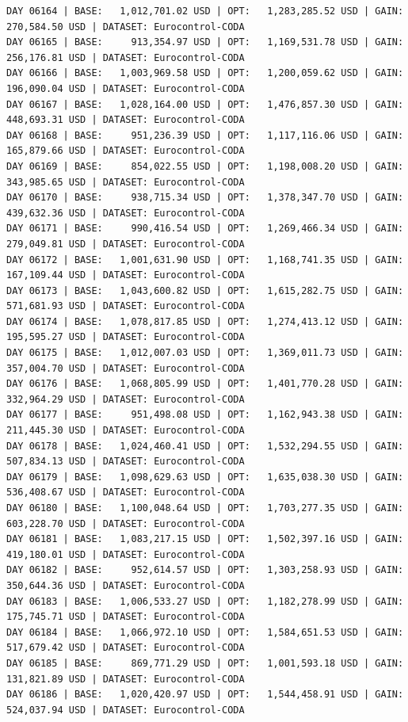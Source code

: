 \documentclass[11pt,a4paper]{article}
\begin{document}
\begin{verbatim}
DAY 06164 | BASE:   1,012,701.02 USD | OPT:   1,283,285.52 USD | GAIN: 270,584.50 USD | DATASET: Eurocontrol-CODA
DAY 06165 | BASE:     913,354.97 USD | OPT:   1,169,531.78 USD | GAIN: 256,176.81 USD | DATASET: Eurocontrol-CODA
DAY 06166 | BASE:   1,003,969.58 USD | OPT:   1,200,059.62 USD | GAIN: 196,090.04 USD | DATASET: Eurocontrol-CODA
DAY 06167 | BASE:   1,028,164.00 USD | OPT:   1,476,857.30 USD | GAIN: 448,693.31 USD | DATASET: Eurocontrol-CODA
DAY 06168 | BASE:     951,236.39 USD | OPT:   1,117,116.06 USD | GAIN: 165,879.66 USD | DATASET: Eurocontrol-CODA
DAY 06169 | BASE:     854,022.55 USD | OPT:   1,198,008.20 USD | GAIN: 343,985.65 USD | DATASET: Eurocontrol-CODA
DAY 06170 | BASE:     938,715.34 USD | OPT:   1,378,347.70 USD | GAIN: 439,632.36 USD | DATASET: Eurocontrol-CODA
DAY 06171 | BASE:     990,416.54 USD | OPT:   1,269,466.34 USD | GAIN: 279,049.81 USD | DATASET: Eurocontrol-CODA
DAY 06172 | BASE:   1,001,631.90 USD | OPT:   1,168,741.35 USD | GAIN: 167,109.44 USD | DATASET: Eurocontrol-CODA
DAY 06173 | BASE:   1,043,600.82 USD | OPT:   1,615,282.75 USD | GAIN: 571,681.93 USD | DATASET: Eurocontrol-CODA
DAY 06174 | BASE:   1,078,817.85 USD | OPT:   1,274,413.12 USD | GAIN: 195,595.27 USD | DATASET: Eurocontrol-CODA
DAY 06175 | BASE:   1,012,007.03 USD | OPT:   1,369,011.73 USD | GAIN: 357,004.70 USD | DATASET: Eurocontrol-CODA
DAY 06176 | BASE:   1,068,805.99 USD | OPT:   1,401,770.28 USD | GAIN: 332,964.29 USD | DATASET: Eurocontrol-CODA
DAY 06177 | BASE:     951,498.08 USD | OPT:   1,162,943.38 USD | GAIN: 211,445.30 USD | DATASET: Eurocontrol-CODA
DAY 06178 | BASE:   1,024,460.41 USD | OPT:   1,532,294.55 USD | GAIN: 507,834.13 USD | DATASET: Eurocontrol-CODA
DAY 06179 | BASE:   1,098,629.63 USD | OPT:   1,635,038.30 USD | GAIN: 536,408.67 USD | DATASET: Eurocontrol-CODA
DAY 06180 | BASE:   1,100,048.64 USD | OPT:   1,703,277.35 USD | GAIN: 603,228.70 USD | DATASET: Eurocontrol-CODA
DAY 06181 | BASE:   1,083,217.15 USD | OPT:   1,502,397.16 USD | GAIN: 419,180.01 USD | DATASET: Eurocontrol-CODA
DAY 06182 | BASE:     952,614.57 USD | OPT:   1,303,258.93 USD | GAIN: 350,644.36 USD | DATASET: Eurocontrol-CODA
DAY 06183 | BASE:   1,006,533.27 USD | OPT:   1,182,278.99 USD | GAIN: 175,745.71 USD | DATASET: Eurocontrol-CODA
DAY 06184 | BASE:   1,066,972.10 USD | OPT:   1,584,651.53 USD | GAIN: 517,679.42 USD | DATASET: Eurocontrol-CODA
DAY 06185 | BASE:     869,771.29 USD | OPT:   1,001,593.18 USD | GAIN: 131,821.89 USD | DATASET: Eurocontrol-CODA
DAY 06186 | BASE:   1,020,420.97 USD | OPT:   1,544,458.91 USD | GAIN: 524,037.94 USD | DATASET: Eurocontrol-CODA

\end{verbatim}
\end{document}
